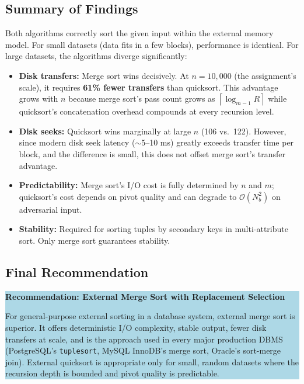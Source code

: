 \documentclass[12pt,a4paper]{article}
\newcommand{\bigO}[1]{\mathcal{O}\!\left(#1\right)}
\newcommand{\ceil}[1]{\left\lceil #1 \right\rceil}
\begin{document}
\subsection{Summary of Findings}

Both algorithms correctly sort the given input within the external memory model.
For small datasets (data fits in a few blocks), performance is identical. For
large datasets, the algorithms diverge significantly:

\begin{itemize}
  \item \textbf{Disk transfers:} Merge sort wins decisively. At $n=10{,}000$
    (the assignment's scale), it requires \textbf{61\% fewer transfers} than
    quicksort. This advantage grows with $n$ because merge sort's pass count
    grows as $\ceil{\log_{m-1} R}$ while quicksort's concatenation overhead
    compounds at every recursion level.

  \item \textbf{Disk seeks:} Quicksort wins marginally at large $n$ (106 vs.\ 122).
    However, since modern disk seek latency ($\sim$5--10 ms) greatly exceeds
    transfer time per block, and the difference is small, this does not offset
    merge sort's transfer advantage.

  \item \textbf{Predictability:} Merge sort's I/O cost is fully determined by
    $n$ and $m$; quicksort's cost depends on pivot quality and can degrade to
    $\bigO{N_b^2}$ on adversarial input.

  \item \textbf{Stability:} Required for sorting tuples by secondary keys in
    multi-attribute sort. Only merge sort guarantees stability.
\end{itemize}

\subsection{Final Recommendation}

\begin{center}
\colorbox{lightblue}{\parbox{0.88\textwidth}{
\vspace{6pt}
\textbf{Recommendation: External Merge Sort with Replacement Selection}

For general-purpose external sorting in a database system, external merge sort
is superior. It offers deterministic I/O complexity, stable output, fewer disk
transfers at scale, and is the approach used in every major production DBMS
(PostgreSQL's \texttt{tuplesort}, MySQL InnoDB's merge sort, Oracle's sort-merge
join). External quicksort is appropriate only for small, random datasets where
the recursion depth is bounded and pivot quality is predictable.
\vspace{6pt}
}}
\end{center}
\end{document}

